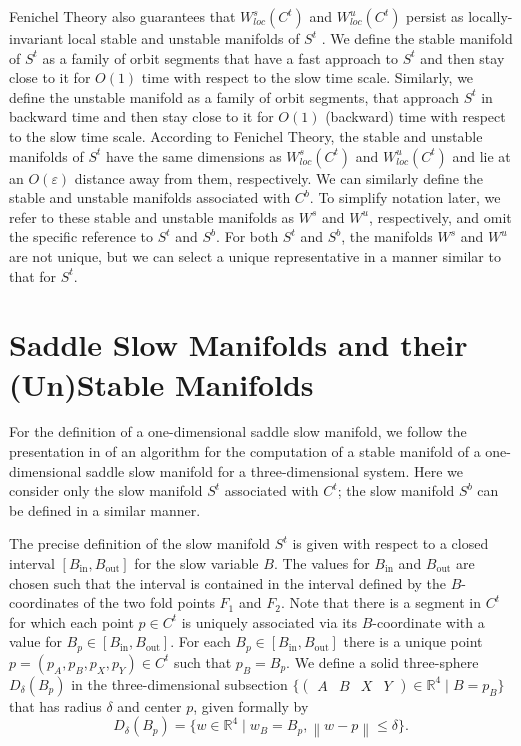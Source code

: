 \documentclass{ws-ijbc}
\begin{document}
Fenichel Theory also guarantees that $W^{s}_{loc}(C^t)$ and $W^{u}_{loc}(C^t)$ persist as locally-invariant local stable and unstable manifolds of $S^t$ \cite{Fenichel}.  We define the stable manifold of $S^t$ as a family of orbit segments that have a fast approach to $S^t$ and then stay close to it for $O(1)$ time with respect to the slow time scale.  Similarly, we define the unstable manifold as a family of orbit segments, that approach $S^t$ in backward time and then stay close to it for $O(1)$ (backward) time with respect to the slow time scale.  According to Fenichel Theory, the stable and unstable manifolds of $S^t$ have the same dimensions as $W^{s}_{loc}(C^t)$ and $W^{u}_{loc}(C^t)$ and lie at an $O(\varepsilon)$ distance away from them, respectively.  We can similarly define the stable and unstable manifolds associated with $C^b$.  To simplify notation later, we refer to these stable and unstable manifolds as $W^s$ and $W^u$, respectively, and omit the specific reference to $S^t$ and $S^b$.  For both $S^t$ and $S^b$, the manifolds $W^s$ and $W^u$ are not unique, but we can select a unique representative in a manner similar to that for $S^t$.
 
 \section{Saddle Slow Manifolds and their (Un)Stable Manifolds}
    
For the definition of a one-dimensional saddle slow manifold, we follow the presentation in \cite{Saeed_Paper} of an algorithm for the computation of a stable manifold of a one-dimensional saddle slow manifold for a three-dimensional system.  Here we consider only the slow manifold $S^t$ associated with $C^t$; the slow manifold $S^b$ can be defined in a similar manner.
    
The precise definition of the slow manifold $S^t$ is given with respect to a closed interval $[B_{\mathrm{in}},B_{\mathrm{out}}]$ for the slow variable $B$.  The values for $B_{\mathrm{in}}$ and $B_{\mathrm{out}}$ are chosen such that the interval is contained in the interval defined by the $B$-coordinates of the two fold points $F_1$ and $F_2$.  Note that there is a segment in $C^t$ for which each point $p \in C^t$ is uniquely associated via its $B$-coordinate with a value for $B_p \in [B_{\mathrm{in}},B_{\mathrm{out}}]$.  For each $B_p \in [B_{\mathrm{in}},B_{\mathrm{out}}]$ there is a unique point $p=(p_A,p_B,p_X,p_Y) \in C^t$ such that $p_B = B_p$.  We define a solid three-sphere $D_\delta(B_p)$ in the three-dimensional subsection $\{ \begin{pmatrix} A & B & X & Y \end{pmatrix} \in \mathbb{R}^4 \; | \; B=p_B\}$ that has radius $\delta$ and center $p$, given formally by
\begin{equation*}
D_\delta(B_p)=\{w \in \mathbb{R}^4 \; | \; w_B = B_p, \left\lVert w-p \right\rVert \leq \delta\}.
\end{equation*}
    
\end{document}
